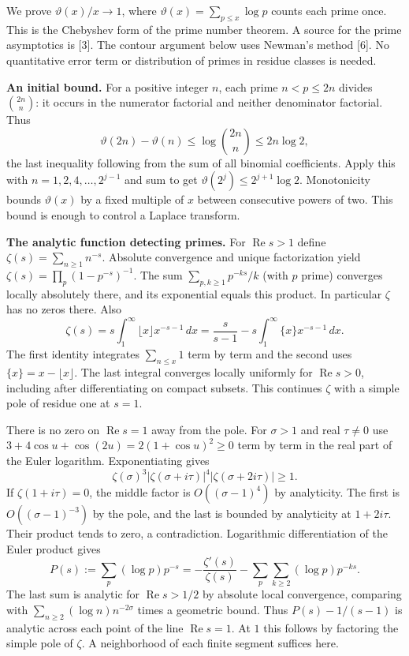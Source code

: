 \documentclass[11pt,a4paper]{article}
\begin{document}
We prove \(\vartheta(x)/x\to1\), where \(\vartheta(x)=\sum_{p\le x}\log p\) counts each prime once. This is the Chebyshev form of the prime number theorem. A source for the prime asymptotics is {[}3{]}. The contour argument below uses Newman's method {[}6{]}. No quantitative error term or distribution of primes in residue classes is needed.

\textbf{An initial bound.} For a positive integer \(n\), each prime \(n<p\le2n\) divides \(\binom{2n}n\): it occurs in the numerator factorial and neither denominator factorial. Thus \[
 \vartheta(2n)-\vartheta(n)\le\log\binom{2n}n\le 2n\log2 ,
\] the last inequality following from the sum of all binomial coefficients. Apply this with \(n=1,2,4,\ldots,2^{j-1}\) and sum to get \(\vartheta(2^j)\le2^{j+1}\log2\). Monotonicity bounds \(\vartheta(x)\) by a fixed multiple of \(x\) between consecutive powers of two. This bound is enough to control a Laplace transform.

\textbf{The analytic function detecting primes.} For \(\operatorname{Re}s>1\) define \(\zeta(s)=\sum_{n\ge1}n^{-s}\). Absolute convergence and unique factorization yield \(\zeta(s)=\prod_p(1-p^{-s})^{-1}\). The sum \(\sum_{p,k\ge1}p^{-ks}/k\) (with \(p\) prime) converges locally absolutely there, and its exponential equals this product. In particular \(\zeta\) has no zeros there. Also \[
 \zeta(s)=s\int_1^\infty \lfloor x\rfloor x^{-s-1}\,dx
 =\frac{s}{s-1}-s\int_1^\infty \{x\}x^{-s-1}\,dx .
\] The first identity integrates \(\sum_{n\le x}1\) term by term and the second uses \(\{x\}=x-\lfloor x\rfloor\). The last integral converges locally uniformly for \(\operatorname{Re}s>0\), including after differentiating on compact subsets. This continues \(\zeta\) with a simple pole of residue one at \(s=1\).

There is no zero on \(\operatorname{Re}s=1\) away from the pole. For \(\sigma>1\) and real \(\tau\ne0\) use \(3+4\cos u+\cos(2u)=2(1+\cos u)^2\ge0\) term by term in the real part of the Euler logarithm. Exponentiating gives \[
 \zeta(\sigma)^3 |\zeta(\sigma+i\tau)|^4 |\zeta(\sigma+2i\tau)|\ge1 .
\] If \(\zeta(1+i\tau)=0\), the middle factor is \(O((\sigma-1)^4)\) by analyticity. The first is \(O((\sigma-1)^{-3})\) by the pole, and the last is bounded by analyticity at \(1+2i\tau\). Their product tends to zero, a contradiction. Logarithmic differentiation of the Euler product gives \[
 P(s):=\sum_p(\log p)p^{-s}
 =-\frac{\zeta'(s)}{\zeta(s)}-\sum_p\sum_{k\ge2}(\log p)p^{-ks}.
\] The last sum is analytic for \(\operatorname{Re}s>1/2\) by absolute local convergence, comparing with \(\sum_{n\ge2}(\log n)n^{-2\sigma}\) times a geometric bound. Thus \(P(s)-1/(s-1)\) is analytic across each point of the line \(\operatorname{Re}s=1\). At \(1\) this follows by factoring the simple pole of \(\zeta\). A neighborhood of each finite segment suffices here.
\end{document}
